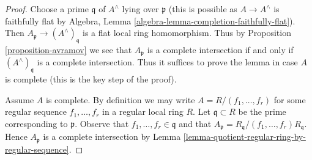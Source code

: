 \documentclass{stacks-project}
\theoremstyle{plain}
\theoremstyle{definition}
\theoremstyle{remark}
\numberwithin{equation}{subsection}
\begin{document}
\begin{proof}
Choose a prime $\mathfrak q$ of $A^\wedge$ lying over $\mathfrak p$
(this is possible as $A \to A^\wedge$ is faithfully flat by
Algebra, Lemma \ref{algebra-lemma-completion-faithfully-flat}).
Then $A_\mathfrak p \to (A^\wedge)_\mathfrak q$ is a flat local
ring homomorphism. Thus by Proposition \ref{proposition-avramov}
we see that $A_\mathfrak p$ is a complete intersection if and only if
$(A^\wedge)_\mathfrak q$ is a complete intersection. Thus it suffices
to prove the lemma in case $A$ is complete (this is the key step
of the proof).

\medskip\noindent
Assume $A$ is complete. By definition we may write
$A = R/(f_1, \ldots, f_r)$ for some regular sequence
$f_1, \ldots, f_r$ in a regular local ring $R$.
Let $\mathfrak q \subset R$ be the prime corresponding to $\mathfrak p$.
Observe that $f_1, \ldots, f_r \in \mathfrak q$ and that
$A_\mathfrak p = R_\mathfrak q/(f_1, \ldots, f_r)R_\mathfrak q$.
Hence $A_\mathfrak p$ is a complete intersection by
Lemma \ref{lemma-quotient-regular-ring-by-regular-sequence}.
\end{proof}
\end{document}
